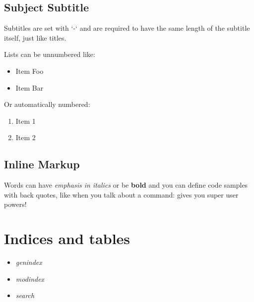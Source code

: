 \documentclass[letterpaper,10pt,spanish]{sphinxmanual}
\begin{document}
\section{Subject Subtitle}
\label{example:subject-subtitle}
Subtitles are set with `-` and are required to have the same length
of the subtitle itself, just like titles.

Lists can be unnumbered like:
\begin{itemize}
\item {} 
Item Foo

\item {} 
Item Bar

\end{itemize}

Or automatically numbered:
\begin{enumerate}
\item {} 
Item 1

\item {} 
Item 2

\end{enumerate}


\section{Inline Markup}
\label{example:inline-markup}
Words can have \emph{emphasis in italics} or be \textbf{bold} and you can define
code samples with back quotes, like when you talk about a command: 
gives you super user powers!


\chapter{Indices and tables}
\label{index:indices-and-tables}\begin{itemize}
\item {} 
\emph{genindex}

\item {} 
\emph{modindex}

\item {} 
\emph{search}

\end{itemize}



\renewcommand{\indexname}{Índice}
\printindex
\end{document}
